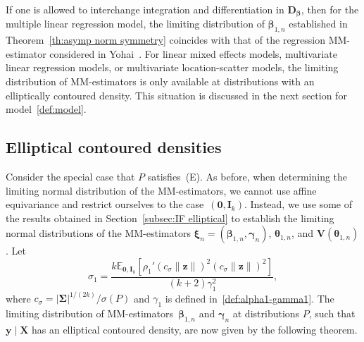 \documentclass{article}
\numberwithin{equation}{section}
\theoremstyle{plain}
\newcommand{\bbeta}{\bm\beta}
\newcommand{\btheta}{\bm\theta}
\newcommand{\bxi}{\bm\xi}
\newcommand{\bgamma}{\bm\gamma}
\newcommand{\bSigma}{\mathbf{\Sigma}}
\newcommand{\by}{\mathbf{y}}
\newcommand{\bz}{\mathbf{z}}
\newcommand{\bX}{\mathbf{X}}
\newcommand{\bV}{\mathbf{V}}
\newcommand{\bI}{\mathbf{I}}
\newcommand{\bD}{\mathbf{D}}
\newcommand{\E}{\mathbb{E}}
\begin{document}
If one is allowed to interchange integration and differentiation in $\bD_{\bbeta}$, 
then for the multiple linear regression model,
the limiting distribution of $\bbeta_{1,n}$ established in Theorem~\ref{th:asymp norm symmetry}
coincides with that of the regression MM-estimator considered in 
Yohai~\cite{yohai1987}.
For linear mixed effects models, multivariate linear regression models, 
or multivariate location-scatter models, the limiting distribution of MM-estimators is only available 
at distributions with an elliptically contoured density.
This situation is discussed in the next section for model~\eqref{def:model}.

\subsection{Elliptical contoured densities}
\label{subsec:asymp norm elliptical}
Consider the special case that $P$ satisfies~(E).
As before, when determining the limiting normal distribution of the MM-estimators,
we cannot use affine equivariance and restrict ourselves to the case~$(\mathbf{0},\bI_k)$.
Instead, we use some of the results obtained in Section~\ref{subsec:IF elliptical}
to establish the limiting normal distributions of the MM-estimators 
$\bxi_n=(\bbeta_{1,n},\bgamma_n)$,
$\btheta_{1,n}$, and $\bV(\btheta_{1,n})$.
Let 
\begin{equation}
\label{def:sigma1}
\sigma_1
=
\frac{k\E_{\mathbf{0},\bI_k}\left[\rho_1'(c_\sigma\|\bz\|)^2(c_\sigma\|\bz\|)^2\right]}{(k+2)\gamma_1^2},
\end{equation}
where $c_\sigma=|\bSigma|^{1/(2k)}/\sigma(P)$
and $\gamma_1$ is defined in~\eqref{def:alpha1-gamma1}.
The limiting distribution of MM-estimators~$\bbeta_{1,n}$ and $\bgamma_n$ 
at distributions $P$, such that~$\by\mid\bX$ has an elliptical contoured density, are now given by the following theorem.
\end{document}
